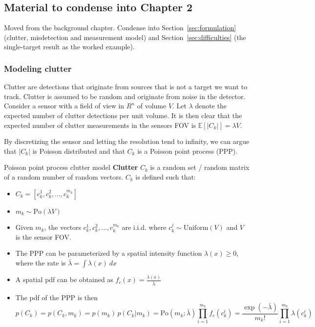 \subsection{Material to condense into Chapter 2}
\label{app:condense}
Moved from the background chapter. Condense into Section~\ref{sec:formulation} (clutter, misdetection and measurement model) and Section~\ref{sec:difficulties} (the single-target result as the worked example).

\subsubsection{Modeling clutter}
Clutter are detections that originate from sources that is not a target we want to track. Clutter is assumed to be random and originate from noise in the detector. Consider a sensor with a field of view in $R^n$ of volume $V$. Let $\lambda$ denote the expected number of clutter detections per unit volume. It is then clear that the expected number of clutter measurements in the sensors FOV is $ \mathbb{E}[\vert C_k \vert] = \lambda V $. 
\medskip

By discretizing the sensor and letting the resolution tend to infinity, we can argue that $\vert C_k \vert$ is Poisson distributed and that $C_k$ is a Poisson point process (PPP). 

\begin{definition}{Poisson point process clutter model}
\textbf{Clutter} $C_k$ is a random set / random matrix of a random number of random vectors. $C_k$ is defined such that:
\begin{itemize}
    \item $C_k = [c^1_k, c^2_k, \ldots , c^{m_k}_k]$
    \item $m_k \sim \text{Po}(\lambda V) $
    \item Given $m_k$, the vectors $c^1_k, c^2_k, \ldots , c^{m_k}_k$ are i.i.d. where $c_k^j \sim \text{Uniform}(V)$ and $V$ is the sensor FOV.
    \item The PPP can be parameterized by a spatial intensity function $\lambda(x) \geq 0$, where the rate is $\bar{\lambda} = \int \lambda(x) \: dx$
    \item A spatial pdf can be obtained as $f_c(x) = \frac{\lambda(x)}{\bar{\lambda}}$
    \item The pdf of the PPP is then 
    \[
    p(C_k) = p(C_k, m_k) = p(m_k) \, p(C_k \vert m_k) = \text{Po}(m_k; \bar{\lambda}) \prod_{i=1}^{m_k} f_c(c^i_k) = \frac{\exp(-\bar{\lambda})}{m_k!} \prod_{i=1}^{m_k} \lambda(c_k^i)
    \]
\end{itemize}
\end{definition}

